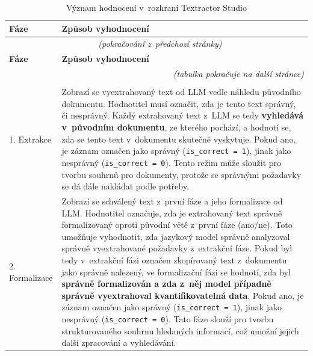 \documentclass[czech, bc, kiv, he, iso690numb, pdf]{fasthesis}
\begin{document}
\renewcommand{\arraystretch}{1.4}
\begin{center}
\begin{longtable}{@{} l >{\RaggedRight\arraybackslash}p{\dimexpr\textwidth-4.5cm\relax} @{}}
\caption{Význam hodnocení v~rozhraní Textractor Studio}
\label{tab:evaluation_modes}\\
\toprule
\textbf{Fáze} & \textbf{Způsob vyhodnocení} \\
\midrule
\endfirsthead
\multicolumn{2}{c}{\tablename~\thetable{} \textit{(pokračování z~předchozí stránky)}}\\
\midrule
\textbf{Fáze} & \textbf{Způsob vyhodnocení} \\
\midrule
\endhead
\midrule
\multicolumn{2}{r}{\textit{(tabulka pokračuje na další stránce)}}\\
\endfoot
\bottomrule
\endlastfoot

\multicolumn{2}{l}{\textbf{Produkční režim -- validace textu z~LLM oproti původnímu dokumentu}} \\ \midrule
1. Extrakce & Zobrazí se vyextrahovaný text od LLM vedle náhledu původního dokumentu. Hodnotitel musí označit, zda je tento text správný, či nesprávný. Každý extrahovaný text z~LLM se tedy \textbf{vyhledává v~původním dokumentu}, ze kterého pochází, a hodnotí se, zda se tento text v~dokumentu skutečně vyskytuje. Pokud ano, je záznam označen jako správný (\verb"is_correct = 1"), jinak jako nesprávný (\verb"is_correct = 0"). Tento režim může sloužit pro tvorbu souhrnů pro dokumenty, protože se správnými požadavky se dá dále nakládat podle potřeby. \\
2. Formalizace & Zobrazí se schválený text z~první fáze a jeho formalizace od LLM. Hodnotitel označuje, zda je extrahovaný text správně formalizovaný oproti původní větě z~první fáze (ano/ne). Toto umožňuje vyhodnotit, zda jazykový model správně analyzoval správně vyextrahované požadavky z~extrakční fáze. Pokud byl tedy v~extrakční fázi označen zkopírovaný text z~dokumentu jako správně nalezený, ve formalizační fázi se hodnotí, zda byl \textbf{správně formalizován a zda z~něj model případně správně vyextrahoval kvantifikovatelná data}. Pokud ano, je záznam označen jako správný (\verb"is_correct = 1"), jinak jako nesprávný (\verb"is_correct = 0"). Tato fáze slouží pro tvorbu strukturovaného souhrnu hledaných informací, což umožní jejich další zpracování a vyhledávání. \\ \midrule


\end{longtable}
\end{center}
\end{document}
